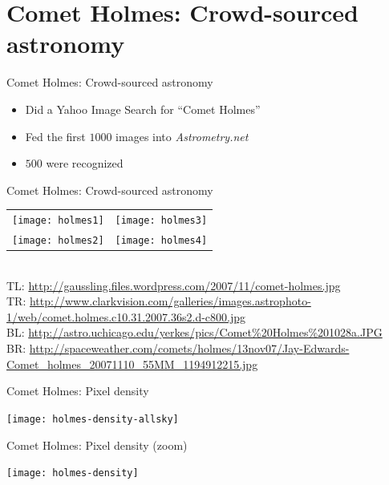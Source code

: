\documentclass[compress]{beamer}
\newcommand{\an}{\emph{Astrometry.net}\xspace}
\begin{document}
\section[]{Comet Holmes: Crowd-sourced astronomy}

\begin{frame}{Comet Holmes: Crowd-sourced astronomy}
  \begin{itemize}
  \item Did a Yahoo Image Search for ``Comet Holmes''
  \item Fed the first $1000$ images into \an
  \item $500$ were recognized
  \end{itemize}
\end{frame}

\begin{frame}{Comet Holmes: Crowd-sourced astronomy}
  \begin{center}
  \begin{tabular}{cc}
    \texttt{[image: holmes1]}&
    \texttt{[image: holmes3]}\\
    \texttt{[image: holmes2]}&
    \texttt{[image: holmes4]}
  \end{tabular}
  \\
  {
    \Tiny
    TL: \url{http://gaussling.files.wordpress.com/2007/11/comet-holmes.jpg}
    \\
    TR: \url{http://www.clarkvision.com/galleries/images.astrophoto-1/web/comet.holmes.c10.31.2007.36s2.d-c800.jpg}
    \\
    BL: \url{http://astro.uchicago.edu/yerkes/pics/Comet\%20Holmes\%201028a.JPG}
    \\
    BR: \url{http://spaceweather.com/comets/holmes/13nov07/Jay-Edwards-Comet_holmes_20071110_55MM_1194912215.jpg}
    \\
  }
  \end{center}
\end{frame}

\begin{frame}{Comet Holmes: Pixel density}
  \begin{center}
    \texttt{[image: holmes-density-allsky]}
  \end{center}
\end{frame}

\begin{frame}{Comet Holmes: Pixel density (zoom)}
  \begin{center}
    \texttt{[image: holmes-density]}
  \end{center}
\end{frame}
\end{document}
